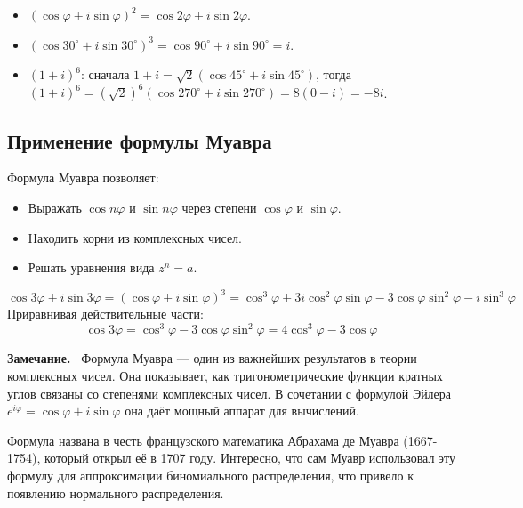 \documentclass[a4paper,12pt]{article}
\newcommand{\myremark}{\textbf{Замечание.}\ }
\theoremstyle{definition}
\theoremstyle{plain}
\theoremstyle{remark}
\begin{document}
	\begin{tcolorbox}[colback=blue!5, colframe=blue!40!black, title=Примеры]
		\begin{itemize}
			\item $(\cos \varphi + i \sin \varphi)^2 = \cos 2\varphi + i \sin 2\varphi$.
			\item $(\cos 30^\circ + i \sin 30^\circ)^3 = \cos 90^\circ + i \sin 90^\circ = i$.
			\item $(1 + i)^6$: сначала $1+i = \sqrt{2}(\cos 45^\circ + i \sin 45^\circ)$, тогда $(1+i)^6 = (\sqrt{2})^6(\cos 270^\circ + i \sin 270^\circ) = 8(0 - i) = -8i$.
		\end{itemize}
	\end{tcolorbox}
	
	\subsection{Применение формулы Муавра}
	
	Формула Муавра позволяет:
	\begin{itemize}
		\item Выражать $\cos n\varphi$ и $\sin n\varphi$ через степени $\cos \varphi$ и $\sin \varphi$.
		\item Находить корни из комплексных чисел.
		\item Решать уравнения вида $z^n = a$.
	\end{itemize}
	
	\begin{tcolorbox}[colback=green!5, colframe=green!50!black, title=Пример: выражение $\cos 3\varphi$]
		\[
		\cos 3\varphi + i \sin 3\varphi = (\cos \varphi + i \sin \varphi)^3 = \cos^3 \varphi + 3i \cos^2 \varphi \sin \varphi - 3 \cos \varphi \sin^2 \varphi - i \sin^3 \varphi
		\]
		Приравнивая действительные части:
		\[
		\cos 3\varphi = \cos^3 \varphi - 3 \cos \varphi \sin^2 \varphi = 4\cos^3 \varphi - 3\cos \varphi
		\]
	\end{tcolorbox}
	
	\myremark
	Формула Муавра — один из важнейших результатов в теории комплексных чисел. Она показывает, как тригонометрические функции кратных углов связаны со степенями комплексных чисел. В сочетании с формулой Эйлера $e^{i\varphi} = \cos\varphi + i\sin\varphi$ она даёт мощный аппарат для вычислений.
	
	\begin{tcolorbox}[colback=purple!5, colframe=purple!50!black, title=Заметочка: История]
		Формула названа в честь французского математика Абрахама де Муавра (1667-1754), который открыл её в 1707 году. Интересно, что сам Муавр использовал эту формулу для аппроксимации биномиального распределения, что привело к появлению нормального распределения.
	\end{tcolorbox}
	
\end{document}
